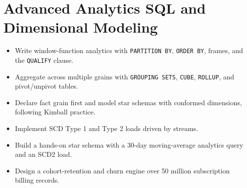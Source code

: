 \chapter{Advanced Analytics SQL and Dimensional Modeling}
%
\begin{objectives}
\begin{itemize}
    \item Write window-function analytics with \texttt{PARTITION BY}, \texttt{ORDER BY}, frames, and the \texttt{QUALIFY} clause.
    \item Aggregate across multiple grains with \texttt{GROUPING SETS}, \texttt{CUBE}, \texttt{ROLLUP}, and pivot/unpivot tables.
    \item Declare fact grain first and model star schemas with conformed dimensions, following Kimball practice.
    \item Implement SCD Type 1 and Type 2 loads driven by streams.
    \item Build a hands-on star schema with a 30-day moving-average analytics query and an SCD2 load.
    \item Design a cohort-retention and churn engine over 50 million subscription billing records.
\end{itemize}
\end{objectives}

